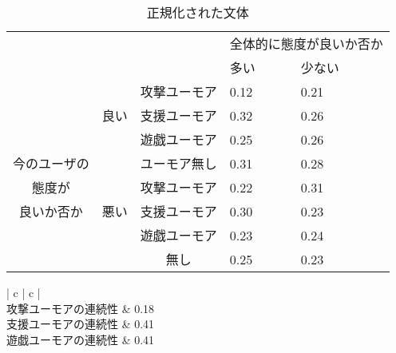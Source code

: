 \begin{table}
\begin{center}
\caption{正規化された文体}
\label{tb:taido}
\begin{tabular}{|c|c|c|p{6em}|p{6em}|}
\hline
\multicolumn{1}{|c}{} & \multicolumn{1}{c}{} & \multicolumn{1}{c|}{} & \multicolumn{2}{c|}{全体的に態度が良いか否か} \\\cline{4-5}
\multicolumn{1}{|c}{} & \multicolumn{1}{c}{} & \multicolumn{1}{c|}{} & \hspace{2zw}多い & \hspace{1.5zw}少ない \\\hline
 &  & 攻撃ユーモア & \hspace{2zw}0.12 & \hspace{2zw}0.21 \\\cline{3-5}
 & 良い & 支援ユーモア & \hspace{2zw}0.32 & \hspace{2zw}0.26 \\\cline{3-5}
 &  & 遊戯ユーモア & \hspace{2zw}0.25 & \hspace{2zw}0.26 \\\cline{3-5}
 今のユーザの &  & ユーモア無し &\hspace{2zw}0.31 & \hspace{2zw}0.28 \\\cline{2-5}
態度が &  & 攻撃ユーモア & \hspace{2zw}0.22 & \hspace{2zw}0.31 \\\cline{3-5}
良いか否か & 悪い & 支援ユーモア & \hspace{2zw}0.30 & \hspace{2zw}0.23 \\\cline{3-5}
 &  & 遊戯ユーモア & \hspace{2zw}0.23 & \hspace{2zw}0.24 \\\cline{3-5}
 &  & 無し & \hspace{2zw}0.25 & \hspace{2zw}0.23 \\\hline
\end{tabular}
\end{center}
\end{table}




\begin{table}[tb]
\begin{center}
\caption{正規化されたユーモアの連続性}
\label{tb:renzoku}
\begin{tabular}{| c | c |}
\hline
      \\\hline
     攻撃ユーモアの連続性 & 0.18 \\\hline
     支援ユーモアの連続性 & 0.41 \\\hline
	 遊戯ユーモアの連続性 & 0.41 \\\hline
     
\end{tabular}
\end{center}
\end{table}




